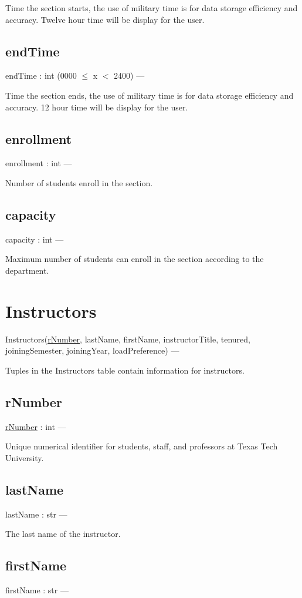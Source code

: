 \documentclass[10pt]{article}
\begin{document}
	Time the section starts, the use of military time is for data storage efficiency and accuracy. Twelve hour time will be display for the user.
	
	\subsection{endTime}
	endTime : int (0000 $\leq$ x $<$ 2400) ---
	
	Time the section ends, the use of military time is for data storage efficiency and accuracy. 12 hour time will be display for the user.
	
	\subsection{enrollment}
	enrollment : int --- 
	
	Number of students enroll in the section.
	
	\subsection{capacity}
	capacity : int ---
	
	Maximum number of students can enroll in the section according to the department. 


\section{Instructors}
Instructors(\underline{rNumber}, lastName, firstName, instructorTitle, tenured, joiningSemester, joiningYear, loadPreference) ---

Tuples in the Instructors table contain information for instructors.
	
	\subsection{rNumber}
	\underline{rNumber} : int ---
	
	Unique numerical identifier for students, staff, and professors at Texas Tech University.
    
    \subsection{lastName}
    lastName : str --- 
    
    The last name of the instructor.
    
    \subsection{firstName}
    firstName : str --- 
    
\end{document}

